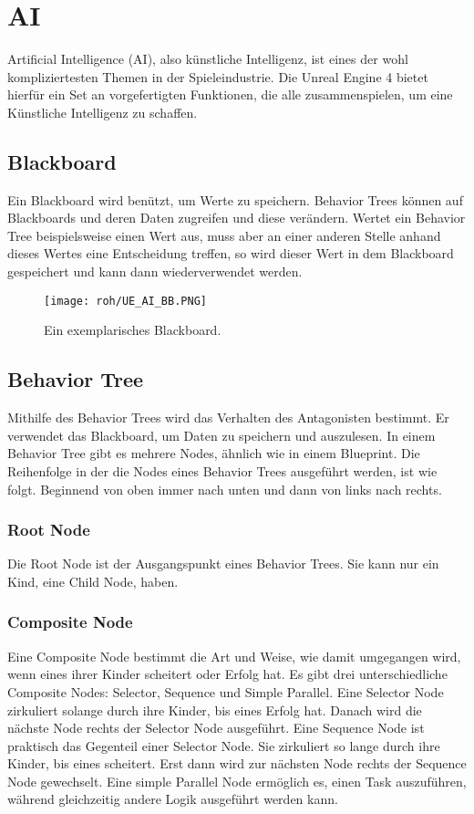 \section{AI}
Artificial Intelligence (AI), also künstliche Intelligenz, ist eines der wohl kompliziertesten Themen in der Spieleindustrie.
Die Unreal Engine 4 bietet hierfür ein Set an vorgefertigten Funktionen, die alle zusammenspielen, um eine Künstliche Intelligenz zu schaffen.
\subsection{Blackboard} \citep{ue:AIBB}
Ein Blackboard wird benützt, um Werte zu speichern.
Behavior Trees können auf Blackboards und deren Daten zugreifen und diese verändern.
Wertet ein Behavior Tree beispielsweise einen Wert aus, muss aber an einer anderen Stelle anhand dieses Wertes eine Entscheidung treffen, so wird dieser Wert in dem Blackboard gespeichert und kann dann wiederverwendet werden.
\begin{figure}[H]
    \centering
    \texttt{[image: roh/UE\_AI\_BB.PNG]}
    \caption{Ein exemplarisches Blackboard.}
    \label{UE:AI_BB}
\end{figure}
\subsection{Behavior Tree}
\citep{ue:AIBB}
Mithilfe des Behavior Trees wird das Verhalten des Antagonisten bestimmt.
Er verwendet das Blackboard, um Daten zu speichern und auszulesen.
In einem Behavior Tree gibt es mehrere Nodes, ähnlich wie in einem Blueprint.
Die Reihenfolge in der die Nodes eines Behavior Trees ausgeführt werden, ist wie folgt.
Beginnend von oben immer nach unten und dann von links nach rechts.
\citep{ue:AIBTNodes}
\subsubsection{Root Node}
Die Root Node ist der Ausgangspunkt eines Behavior Trees.
Sie kann nur ein Kind, eine Child Node, haben.
\subsubsection{Composite Node}
Eine Composite Node bestimmt die Art und Weise, wie damit umgegangen wird, wenn eines ihrer Kinder scheitert oder Erfolg hat.
Es gibt drei unterschiedliche Composite Nodes:
Selector, Sequence und Simple Parallel.
Eine Selector Node zirkuliert solange durch ihre Kinder, bis eines Erfolg hat.
Danach wird die nächste Node rechts der Selector Node ausgeführt.
Eine Sequence Node ist praktisch das Gegenteil einer Selector Node.
Sie zirkuliert so lange durch ihre Kinder, bis eines scheitert.
Erst dann wird zur nächsten Node rechts der Sequence Node gewechselt.
Eine simple Parallel Node ermöglich es, einen Task auszuführen, während gleichzeitig andere Logik ausgeführt werden kann.
